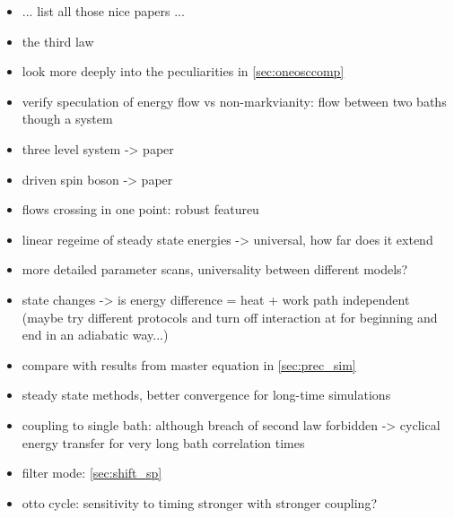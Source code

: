 \begin{itemize}
\item ... list all those nice papers ...
\item the third law
\item look more deeply into the peculiarities in \cref{sec:oneosccomp}
\item verify speculation of energy flow vs non-markvianity: flow
  between two baths though a system
\item three level system -> paper
\item driven spin boson -> paper \cite{Magazzu2018Apr}
\item flows crossing in one point: robust featureu
\item linear regeime of steady state energies -> universal, how far
  does it extend
\item more detailed parameter scans, universality between different models?
\item state changes -> is energy difference = heat + work path
  independent (maybe try different protocols and turn off interaction
  at for beginning and end in an adiabatic way...)
\item compare with results from master equation in \cref{sec:prec_sim}
\item steady state methods, better convergence for long-time
  simulations
\item coupling to single bath: although breach of second law forbidden
  -> cyclical energy transfer for very long bath correlation times
\item filter mode: \cref{sec:shift_sp}
\item otto cycle: sensitivity to timing stronger with stronger coupling?
\end{itemize}
